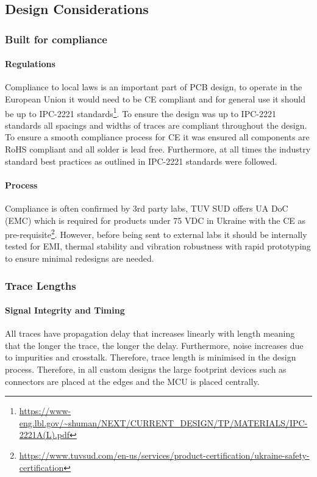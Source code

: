 \subsection{Design Considerations}\label{sub_section:tgt_design_considerations}

\subsubsection{Built for compliance}
\paragraph{Regulations}
Compliance to local laws is an important part of \gls{PCB} design, to operate in the European Union it would need to be CE compliant and for general use it should be up to IPC-2221 standards\footnote{\url{https://www-eng.lbl.gov/~shuman/NEXT/CURRENT_DESIGN/TP/MATERIALS/IPC-2221A(L).pdf}}. To ensure the design was up to IPC-2221 standards all spacings and widths of traces are compliant throughout the design. To ensure a smooth compliance process for CE it was ensured all components are \gls{RoHS} compliant and all solder is lead free. Furthermore, at all times the industry standard best practices as outlined in IPC-2221 standards were followed.
\paragraph{Process}
Compliance is often confirmed by 3rd party labs, TUV SUD offers UA DoC (EMC) which is required for products under 75 VDC in Ukraine with the CE as pre-requisite\footnote{\url{https://www.tuvsud.com/en-us/services/product-certification/ukraine-safety-certification}}. However, before being sent to external labs it should be internally tested for \gls{EMI}, thermal stability and vibration robustness with rapid prototyping to ensure minimal redesigns are needed.

\subsubsection{Trace Lengths}\label{sub_sub_section:tgt_trace_lengths}
\paragraph{Signal Integrity and Timing}
All traces have propagation delay that increases linearly with length meaning that the longer the trace, the longer the delay. Furthermore, noise increases due to impurities and crosstalk. Therefore, trace length is minimised in the design process. Therefore, in all custom designs the large footprint devices such as connectors are placed at the edges and the \gls{MCU} is placed centrally.
